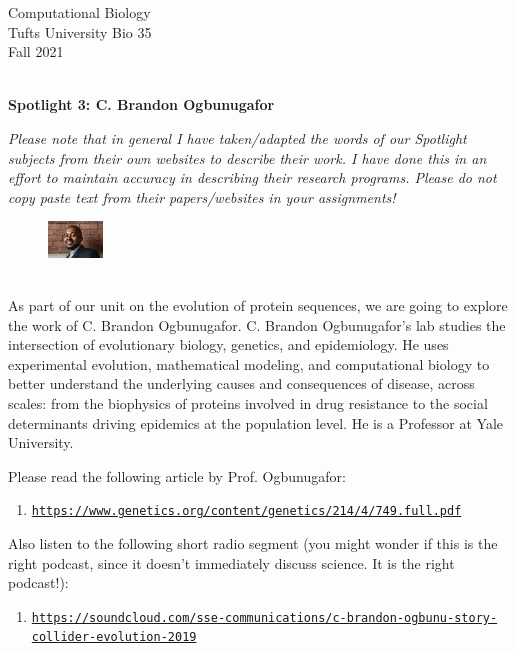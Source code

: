 \documentclass{article}
\begin{document}
\BeginAccSupp{}
\begin{flushright}
Computational Biology ~\\
Tufts University Bio 35 ~\\
Fall 2021 ~\\ ~\\
\end{flushright}
\begin{center}{\textbf{\Large{Spotlight 3: C. Brandon Ogbunugafor}}}\end{center}

\textit{Please note that in general I have taken/adapted the words of our Spotlight subjects from their own websites to describe their work. I have done this in an effort to maintain accuracy in describing their research programs. Please do not copy paste text from their papers/websites in your assignments!}

\begin{figure}
\begin{center}
 \includegraphics[width=0.13\textwidth]{images/Brandon-Ogbunu.png}
 \end{center}
\end{figure}
~\\ As part of our unit on the evolution of protein sequences, we are going to explore the work of C. Brandon Ogbunugafor. C. Brandon Ogbunugafor's lab studies the intersection of evolutionary biology, genetics, and epidemiology. He uses experimental evolution, mathematical modeling, and computational biology to better understand the underlying causes and consequences of disease, across scales: from the biophysics of proteins involved in drug resistance to the social determinants driving epidemics at the population level. He is a Professor at Yale University.

Please read the following article by Prof. Ogbunugafor: 
\begin{enumerate}
\item \texttt{\href{https://www.genetics.org/content/genetics/214/4/749.full.pdf}{https://www.genetics.org/content/genetics/214/4/749.full.pdf}}
\end{enumerate}

Also listen to the following short radio segment (you might wonder if this is the right podcast, since it doesn't immediately discuss science. It is the right podcast!):
\begin{enumerate}
\item \texttt{\href{https://soundcloud.com/sse-communications/c-brandon-ogbunu-story-collider-evolution-2019}{https://soundcloud.com/sse-communications/c-brandon-ogbunu-story-collider-evolution-2019}}
\end{enumerate}
\end{document}

